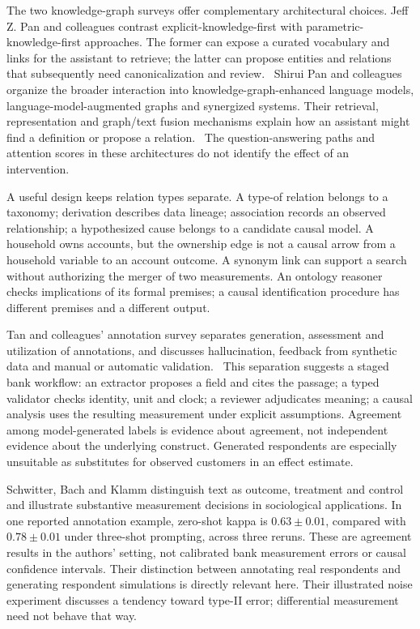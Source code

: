 The two knowledge-graph surveys offer complementary architectural choices.
Jeff Z. Pan and colleagues contrast explicit-knowledge-first with
parametric-knowledge-first approaches. The former can expose a curated
vocabulary and links for the assistant to retrieve; the latter can propose
entities and relations that subsequently need canonicalization and
review.~\citep{exec17_ontology_kg_challenges} Shirui Pan and colleagues organize
the broader interaction into knowledge-graph-enhanced language models,
language-model-augmented graphs and synergized systems. Their retrieval,
representation and graph/text fusion mechanisms explain how an assistant might
find a definition or propose a relation.~\citep{exec17_ontology_kg_roadmap}
The question-answering paths and attention scores in these architectures do
not identify the effect of an intervention.

A useful design keeps relation types separate. A type-of relation
belongs to a taxonomy; derivation describes data lineage; association
records an observed relationship; a hypothesized cause belongs to a
candidate causal model. A household owns accounts, but the ownership edge is
not a causal arrow from a household variable to an account outcome. A synonym
link can support a search without authorizing the merger of two measurements.
An ontology reasoner checks implications of its formal premises; a causal
identification procedure has different premises and a different output.

Tan and colleagues' annotation survey separates generation, assessment and
utilization of annotations, and discusses hallucination, feedback from
synthetic data and manual or automatic validation.~\citep{exec17_ontology_annotation}
This separation suggests a staged bank workflow: an extractor proposes a
field and cites the passage; a typed validator checks identity, unit and
clock; a reviewer adjudicates meaning; a causal analysis uses the resulting
measurement under explicit assumptions. Agreement among model-generated
labels is evidence about agreement, not independent evidence about the
underlying construct. Generated respondents are especially unsuitable as
substitutes for observed customers in an effect estimate.

Schwitter, Bach and Klamm distinguish text as outcome, treatment and control
and illustrate substantive measurement decisions in sociological
applications. In one reported annotation example, zero-shot kappa is
\(0.63\pm0.01\), compared with \(0.78\pm0.01\) under three-shot prompting,
across three reruns. These are agreement results in the authors' setting,
not calibrated bank measurement errors or causal confidence intervals.
Their distinction between annotating real respondents and generating
respondent simulations is directly relevant here. Their illustrated noise
experiment discusses a tendency toward type-II error; differential
measurement need not behave that way.~\citep{exec17_ontology_sociology}

